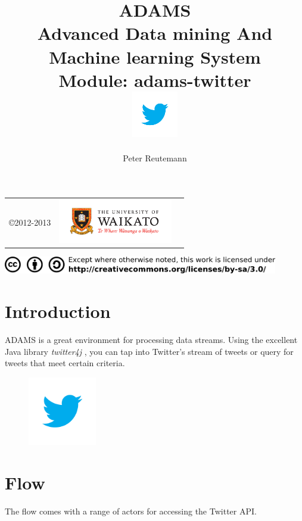 \documentclass[a4paper]{book}
\title{
  \textbf{ADAMS} \\
  {\Large \textbf{A}dvanced \textbf{D}ata mining \textbf{A}nd \textbf{M}achine
  learning \textbf{S}ystem} \\
  {\Large Module: adams-twitter} \\
  \vspace{1cm}
  \includegraphics[width=2cm]{images/twitter-bird-blue-on-white.png} \\
}
\author{
  Peter Reutemann
}
\begin{document}
\begin{titlepage}
\maketitle

\thispagestyle{empty}
\center
\begin{table}[b]
	\begin{tabular}{c l l}
		\parbox[c][2cm]{2cm}{\copyright 2012-2013} &
		\parbox[c][2cm]{5cm}{\includegraphics[width=5cm]{images/coat_of_arms.pdf}} \\
	\end{tabular}
	\includegraphics[width=12cm]{images/cc.png} \\
\end{table}

\end{titlepage}

\tableofcontents
\listoffigures

\chapter{Introduction}
ADAMS is a great environment for processing data streams. Using the excellent
Java library \textit{twitter4j} \cite{twitter4j}, you can tap into Twitter's 
stream of tweets or query for tweets that meet certain criteria.

\begin{figure}[htb]
  \centering
  \includegraphics[width=3.0cm]{images/twitter-bird-blue-on-white.png}
\end{figure}

\chapter{Flow}
The flow comes with a range of actors for accessing the Twitter API.
\end{document}
